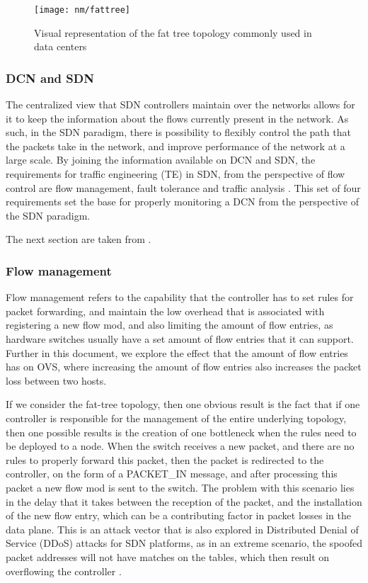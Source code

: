 \begin{figure} [!htbp]
    \centering
    \texttt{[image: nm/fattree]}
    \caption{Visual representation of the fat tree topology commonly used in data centers}
    \label{fig:fattree}
\end{figure}

\subsubsection {DCN and SDN}

\par The centralized view that SDN controllers maintain over the networks allows for it to keep the information about the flows currently present in the network. As
such, in the SDN paradigm, there is possibility to flexibly control the path that the packets take in the network, and improve performance of the network at a large
scale. By joining the information available on DCN and SDN, the requirements for traffic engineering (TE) in SDN, from the perspective of flow control are flow 
management, fault tolerance and traffic analysis \cite{akyildiz_research_2016}. This set of four requirements set the base for properly monitoring a DCN from the 
perspective of the SDN paradigm.
\par The next section are taken from \cite{akyildiz_research_2016}.

\subsubsection {Flow management}

Flow management refers to the capability that the controller has to set rules for packet forwarding, and maintain the low overhead that is associated with
registering a new flow mod, and also limiting the amount of flow entries, as hardware switches usually have a set amount of flow entries that it can support. Further
in this document, we explore the effect that the amount of flow entries has on OVS, where increasing the amount of flow entries also increases the packet loss
between two hosts.

\par If we consider the fat-tree topology, then one obvious result is the fact that if one controller is responsible for the management of the entire underlying 
topology, then one possible results is the creation of one bottleneck when the rules need to be deployed to a node. When the switch receives a new packet, and there 
are no rules to properly forward this packet, then the packet is redirected to the controller, on the form of a \textsc{PACKET\_IN} message, and after processing
this packet a new flow mod is sent to the switch. The problem with this scenario lies in the delay that it takes between the reception of the packet, and the
installation of the new flow entry, which can be a contributing factor in packet losses in the data plane. This is an attack vector that is also explored in
Distributed Denial of Service (DDoS) attacks for SDN platforms, as in an extreme scenario, the spoofed packet addresses will not have matches on the tables, which
then result on overflowing the controller \cite{mousavi_early_2015}.

